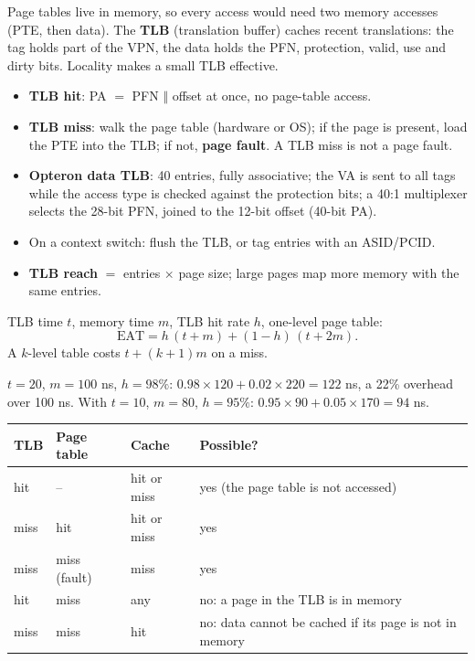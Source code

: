 \begin{definition}
Page tables live in memory, so every access would need two memory accesses
(PTE, then data). The \textbf{TLB} (translation buffer) caches recent
translations: the tag holds part of the VPN, the data holds the PFN, protection,
valid, use and dirty bits. Locality makes a small TLB effective.
\end{definition}
\begin{itemize}
  \item \textbf{TLB hit}: PA $=$ PFN $\Vert$ offset at once, no page-table access.
  \item \textbf{TLB miss}: walk the page table (hardware or OS); if the page is
  present, load the PTE into the TLB; if not, \textbf{page fault}. A TLB miss is
  not a page fault.
  \item \textbf{Opteron data TLB}: 40 entries, fully associative; the VA is sent to
  all tags while the access type is checked against the protection bits; a 40:1
  multiplexer selects the 28-bit PFN, joined to the 12-bit offset (40-bit PA).
  \item On a context switch: flush the TLB, or tag entries with an ASID/PCID.
  \item \textbf{TLB reach} $=$ entries $\times$ page size; large pages map more
  memory with the same entries.
\end{itemize}

\begin{prop}
TLB time $t$, memory time $m$, TLB hit rate $h$, one-level page table:
\[
  \text{EAT}=h\,(t+m)+(1-h)\,(t+2m).
\]
A $k$-level table costs $t+(k+1)m$ on a miss.
\end{prop}
\begin{eg}
$t=20$, $m=100$ ns, $h=98\%$: $0.98\times120+0.02\times220=122$ ns, a 22\%
overhead over 100 ns. With $t=10$, $m=80$, $h=95\%$:
$0.95\times90+0.05\times170=94$ ns.
\end{eg}

\begin{center}
\small
\begin{tabular}{@{}lllp{6.2cm}@{}}
\toprule
TLB & Page table & Cache & Possible? \\
\midrule
hit & -- & hit or miss & yes (the page table is not accessed) \\
miss & hit & hit or miss & yes \\
miss & miss (fault) & miss & yes \\
hit & miss & any & no: a page in the TLB is in memory \\
miss & miss & hit & no: data cannot be cached if its page is not in memory \\
\bottomrule
\end{tabular}
\end{center}

